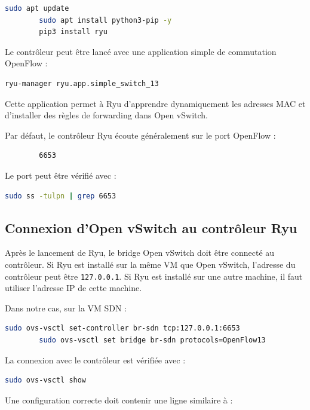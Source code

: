 \documentclass[12pt,a4paper,oneside]{report}
\begin{document}
	\begin{lstlisting}[language=bash]
		sudo apt update
		sudo apt install python3-pip -y
		pip3 install ryu
	\end{lstlisting}
	
	Le contrôleur peut être lancé avec une application simple de commutation OpenFlow :
	
	\begin{lstlisting}[language=bash]
		ryu-manager ryu.app.simple_switch_13
	\end{lstlisting}
	
	Cette application permet à Ryu d'apprendre dynamiquement les adresses MAC et d'installer des règles de forwarding dans Open vSwitch.
	
	Par défaut, le contrôleur Ryu écoute généralement sur le port OpenFlow :
	
	\begin{lstlisting}
		6653
	\end{lstlisting}
	
	Le port peut être vérifié avec :
	
	\begin{lstlisting}[language=bash]
		sudo ss -tulpn | grep 6653
	\end{lstlisting}
	
	\subsection{Connexion d'Open vSwitch au contrôleur Ryu}
	
	Après le lancement de Ryu, le bridge Open vSwitch doit être connecté au contrôleur. Si Ryu est installé sur la même VM que Open vSwitch, l'adresse du contrôleur peut être \texttt{127.0.0.1}. Si Ryu est installé sur une autre machine, il faut utiliser l'adresse IP de cette machine.
	
	Dans notre cas, sur la VM SDN :
	
	\begin{lstlisting}[language=bash]
		sudo ovs-vsctl set-controller br-sdn tcp:127.0.0.1:6653
		sudo ovs-vsctl set bridge br-sdn protocols=OpenFlow13
	\end{lstlisting}
	
	La connexion avec le contrôleur est vérifiée avec :
	
	\begin{lstlisting}[language=bash]
		sudo ovs-vsctl show
	\end{lstlisting}
	
	Une configuration correcte doit contenir une ligne similaire à :
	
\end{document}

